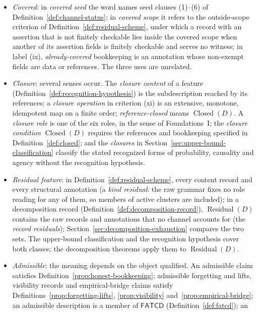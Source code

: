 \documentclass[11pt]{article}
\theoremstyle{definition}
\newcommand{\FATCD}{\ensuremath{\mathsf{FATCD}}}
\newcommand{\Closed}[1]{\ensuremath{\operatorname{Closed}\!\left(#1\right)}}
\newcommand{\Residual}[1]{\ensuremath{\operatorname{Residual}\!\left(#1\right)}}
\begin{document}
\begin{itemize}[topsep=2pt,itemsep=1pt]
    predicate of Remark~\ref{rem:recognition-open} does not.
  \item \emph{Covered}: in \emph{covered seed} the word names seed clauses
    (1)--(6) of Definition~\ref{def:channel-status}; in \emph{covered scope}
    it refers to the outside-scope criterion of Definition~\ref{def:residual-scheme}, under which a record with an assertion that is not finitely checkable lies inside the covered scope when another of its assertion fields is finitely checkable and serves no witness; in label (ix), \emph{already-covered}
    bookkeeping is an annotation whose non-exempt fields are data or
    references. The three uses are unrelated.
  \item \emph{Closure}: several senses occur. The \emph{closure content} of a
    feature (Definition~\ref{def:recognition-hypothesis}) is the subdescription
    reached by its references; a \emph{closure operation} in criterion (xi) is an
    extensive, monotone, idempotent map on a finite order; \emph{reference-closed}
    means \(\Closed{D}\). A \emph{closure role} is one
    of the six roles, in the sense of Foundations~I; the \emph{closure
    condition} \(\Closed{D}\) requires the references and bookkeeping
    specified in Definition~\ref{def:closed}; and the \emph{closures} in
    Section~\ref{sec:upper-bound-classification} classify the stated
    recognized forms of probability, causality and agency without the
    recognition hypothesis.
  \item \emph{Residual feature}: in
    Definition~\ref{def:residual-scheme}, every content record and every
    structural annotation (a \emph{kind residual}: the raw grammar fixes no
    role reading for any of them, so members of active clusters are included); in a
    decomposition record (Definition~\ref{def:decomposition-record}),
    \(\Residual{D}\) contains the raw records and annotations that no channel
    accounts for (the \emph{record residuals}); Section~\ref{sec:decomposition-exhaustion}
    compares the two sets. The
    upper-bound classification and the recognition hypothesis cover both
    classes; the decomposition theorems apply them to \(\Residual{D}\).
  \item \emph{Admissible}: the meaning depends on the object qualified. An
    admissible claim satisfies Definition~\ref{prop:honest-bookkeeping};
    admissible forgetting and lifts, visibility records and empirical-bridge
    claims satisfy Definitions~\ref{prop:forgetting-lifts},
    \ref{prop:visibility} and~\ref{prop:empirical-bridge}; an admissible
    description is a member of \FATCD{} (Definition~\ref{def:fatcd}); an

\end{itemize}
\end{document}
